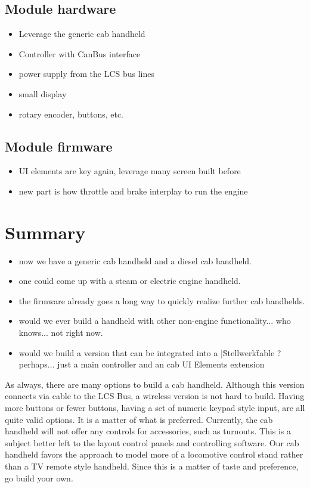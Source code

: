 \subsection{Module hardware}

\begin{itemize}
\item Leverage the generic cab handheld
\item Controller with CanBus interface
\item power supply from the LCS bus lines
\item small display
\item rotary encoder, buttons, etc.
\end{itemize}

\subsection{Module firmware}

\begin{itemize}
\item UI elements are key again, leverage many screen built before
\item new part is how throttle and brake interplay to run the engine
\end{itemize}


\section{Summary}

\begin{itemize}
\item now we have a generic cab handheld and a diesel cab handheld.
\item one could come up with a steam or electric engine handheld. 
\item the firmware already goes a long way to quickly realize further cab handhelds.
\item would we ever build a handheld with other non-engine functionality... who knows... not right now.
\item would we build a version that can be integrated into a |\"Stellwerk\" table ? perhaps... just a main controller and an cab UI Elements extension
\end{itemize}

As always, there are many options to build a cab handheld. Although this version connects via cable to the LCS Bus, a wireless version is not hard to build. Having more buttons or fewer buttons, having a set of numeric keypad style input, are all quite valid options. It is a matter of what is preferred. Currently, the cab handheld will not offer any controls for accessories, such as turnouts. This is a subject better left to the layout control panels and controlling software. Our cab handheld favors the approach to model more of a locomotive control stand rather than a TV remote style handheld. Since this is a matter of taste and preference, go build your own.

